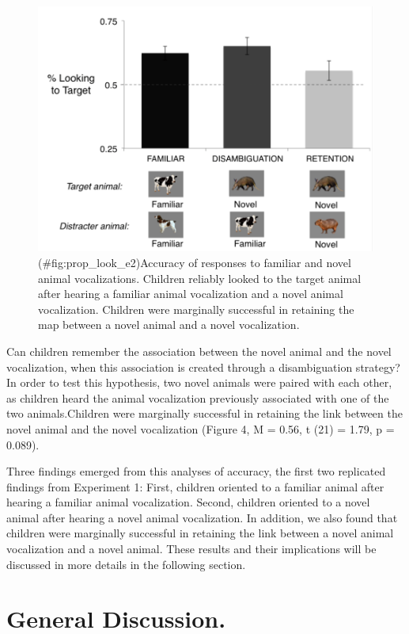 \documentclass[english,floatsintext,man]{apa6}
\theoremstyle{definition}
\theoremstyle{definition}
\theoremstyle{definition}
\theoremstyle{remark}
\begin{document}
\begin{figure}
\centering
\includegraphics{anime_manuscript_files/figure-latex/prop_look_e2-1.pdf}
\caption{(\#fig:prop\_look\_e2)Accuracy of responses to familiar and
novel animal vocalizations. Children reliably looked to the target
animal after hearing a familiar animal vocalization and a novel animal
vocalization. Children were marginally successful in retaining the map
between a novel animal and a novel vocalization.}
\end{figure}

Can children remember the association between the novel animal and the
novel vocalization, when this association is created through a
disambiguation strategy? In order to test this hypothesis, two novel
animals were paired with each other, as children heard the animal
vocalization previously associated with one of the two animals.Children
were marginally successful in retaining the link between the novel
animal and the novel vocalization (Figure 4, M = 0.56, t (21) = 1.79, p
= 0.089).

Three findings emerged from this analyses of accuracy, the first two
replicated findings from Experiment 1: First, children oriented to a
familiar animal after hearing a familiar animal vocalization. Second,
children oriented to a novel animal after hearing a novel animal
vocalization. In addition, we also found that children were marginally
successful in retaining the link between a novel animal vocalization and
a novel animal. These results and their implications will be discussed
in more details in the following section.

\section{General Discussion.}\label{general-discussion.}
\end{document}
